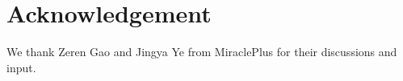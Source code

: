 \section*{Acknowledgement}
We thank Zeren Gao and Jingya Ye from MiraclePlus for their discussions and input.

